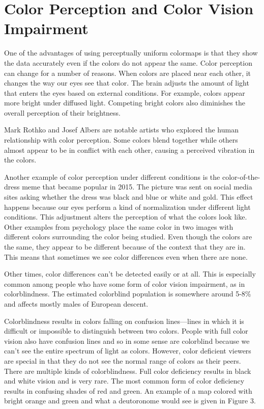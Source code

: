 \documentclass[journal]{IEEEtran}
\begin{document}
\section{Color Perception and Color Vision Impairment}

One of the advantages of using perceptually uniform colormaps is
that they show the data accurately even if the colors do not appear
the same. Color perception can change for a number of reasons. When 
colors are placed near each other, it changes the way our eyes see that color.
The brain adjusts the amount of light that enters the eyes based
on external conditions. For example, colors appear more bright under diffused
light. Competing bright colors also diminishes the overall perception
of their brightness.

Mark Rothko and Josef Albers are notable artists who explored the human relationship
with color perception. Some colors blend together while others almost appear to be in
conflict with each other, causing a perceived vibration in the colors.

Another example of color perception under different conditions is the 
color-of-the-dress meme that became popular in 2015. The picture was
sent on social media sites asking whether the dress was black and blue
or white and gold. This effect happens because our eyes perform a kind 
of normalization under different light conditions. This adjustment alters
the perception of what the colors look like. Other examples from psychology 
place the same color in two images with different colors surrounding the
color being studied. Even though the colors are the same, they appear to be 
different because of the context that they are in. This means that sometimes
we see color differences even when there are none.

Other times, color differences can't be detected easily or at all. This is 
especially common among people who have some form of color vision impairment,
as in colorblindness. The estimated colorblind population is somewhere around 5-8\%
and affects mostly males of European descent.

Colorblindness results in colors falling on confusion lines---lines in which it
is difficult or impossible to distinguish between two colors. People with full
color vision also have confusion lines and so in some sense are colorblind because 
we can't see the entire spectrum of light as colors. However, color deficient viewers
are special in that they do not see the normal range of colors as their peers.
There are multiple kinds of colorblindness.
Full color deficiency results in black and white vision and is very rare.
The most common form of color deficiency results in confusing shades of red and green.
An example of a map colored with bright orange and green and what a deutoronome
would see is given in Figure 3.
\end{document}
